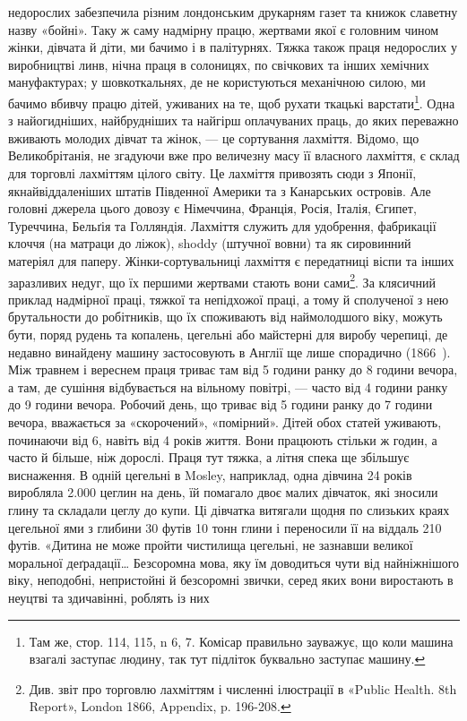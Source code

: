 \parcont{}  %
недорослих забезпечила різним лондонським друкарням газет
та книжок славетну назву «бойні». Таку ж саму надмірну
працю, жертвами якої є головним чином жінки, дівчата й діти,
ми бачимо і в палітурнях. Тяжка також праця недорослих у
виробництві линв, нічна праця в солоницях, по свічкових та інших
хемічних мануфактурах; у шовкоткальнях, де не користуються
механічною силою, ми бачимо вбивчу працю дітей, уживаних на
те, щоб рухати ткацькі варстати\footnote{
Там же, стор. 114, 115, n 6, 7. Комісар правильно зауважує,
що коли машина взагалі заступає людину, так тут підліток буквально
заступає машину.
}. Одна з найогидніших, найбрудніших
та найгірш оплачуваних праць, до яких переважно
вживають молодих дівчат та жінок, — це сортування лахміття.
Відомо, що Великобрітанія, не згадуючи вже про величезну масу
її власного лахміття, є склад для торговлі лахміттям цілого світу.
Це лахміття привозять сюди з Японії, якнайвіддаленіших штатів
Південної Америки та з Канарських островів. Але головні джерела
цього довозу є Німеччина, Франція, Росія, Італія, Єгипет,
Туреччина, Бельґія та Голляндія. Лахміття служить для
удобрення, фабрикації клоччя (на матраци до ліжок), shoddy
(штучної вовни) та як сировинний матеріял для паперу. Жінки-сортувальниці
лахміття є передатниці віспи та інших заразливих
недуг, що їх першими жертвами стають вони сами\footnote{
Див. звіт про торговлю лахміттям і численні ілюстрації в «Public
Health. 8th Report», London 1866, Appendix, p. 196-208.
}. За клясичний
приклад надмірної праці, тяжкої та непідхожої праці, а
тому й сполученої з нею брутальности до робітників, що їх споживають
від наймолодшого віку, можуть бути, поряд рудень та
копалень, цегельні або майстерні для виробу черепиці, де недавно
винайдену машину застосовують в Англії ще лише спорадично
(1866~). Між травнем і вереснем праця триває там від 5 години
ранку до 8 години вечора, а там, де сушіння відбувається на
вільному повітрі, — часто від 4 години ранку до 9 години вечора.
Робочий день, що триває від 5 години ранку до 7 години вечора,
вважається за «скорочений», «помірний». Дітей обох статей
уживають, починаючи від 6, навіть від 4 років життя. Вони працюють
стільки ж годин, а часто й більше, ніж дорослі. Праця
тут тяжка, а літня спека ще збільшує виснаження. В одній цегельні
в Mosley, наприклад, одна дівчина 24 років виробляла
\num{2.000} цеглин на день, їй помагало двоє малих дівчаток, які зносили
глину та складали цеглу до купи. Ці дівчатка витягали
щодня по слизьких краях цегельної ями з глибини 30 футів 10 тонн
глини і переносили її на віддаль 210 футів. «Дитина не може
пройти чистилища цегельні, не зазнавши великої моральної
деґрадації\dots{} Безсоромна мова, яку їм доводиться чути від найніжнішого
віку, неподобні, непристойні й безсоромні звички, серед
яких вони виростають в неуцтві та здичавінні, роблять із них
\parbreak{}  %

